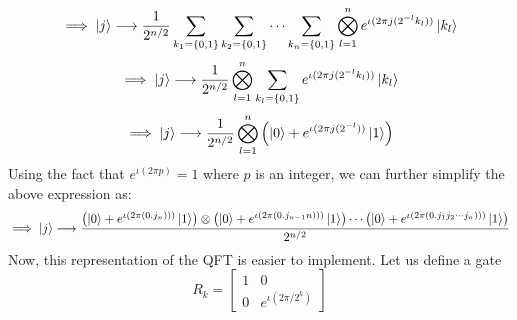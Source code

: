 \documentclass{article}
\begin{document}
$$\implies \ket{j} \longrightarrow  \frac{1}{2^{n/2}}\sum_{k_1=\{0, 1\}}\sum_{k_2=\{0, 1\}} \cdots \sum_{k_n=\{0, 1\}} \bigotimes_{l=1}^n e^{\iota(2\pi j(2^{-l}k_l))}\ket{k_l}$$
$$\implies \ket{j} \longrightarrow  \frac{1}{2^{n/2}} \bigotimes_{l=1}^n \sum_{k_l=\{0, 1\}} e^{\iota(2\pi j(2^{-l}k_l))}\ket{k_l}$$
$$\implies \ket{j} \longrightarrow  \frac{1}{2^{n/2}} \bigotimes_{l=1}^n \left( \ket{0} + e^{\iota(2\pi j(2^{-l}))}\ket{1}\right)$$
Using the fact that $e^{\iota (2\pi p)} = 1$ where $p$ is an integer, we can further simplify the above expression as:
$$\implies \ket{j} \longrightarrow \frac{\left( \ket{0} + e^{\iota(2\pi (0.j_n)))}\ket{1}\right)\otimes  \left( \ket{0} + e^{\iota(2\pi (0.j_{n-1}{n})))}\ket{1}\right) \cdots \left( \ket{0} + e^{\iota(2\pi (0.j_1j_2 \cdots j_n)))}\ket{1}\right)}{2^{n/2}} $$
Now, this representation of the QFT is easier to implement. Let us define a gate  $$R_k = \begin{bmatrix}
1 & 0 \\
0 & e^{\iota(2\pi /2^k)}
\end{bmatrix}$$
\end{document}
